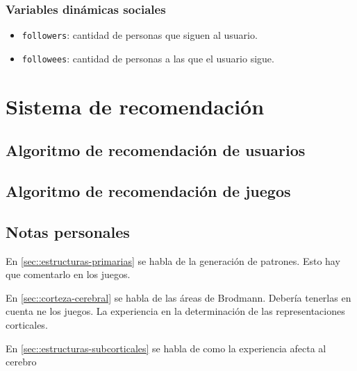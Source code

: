 \subsubsection{Variables dinámicas sociales}

\begin{itemize}
\item {\tt followers}: cantidad de personas que siguen al usuario.
\item {\tt followees}: cantidad de personas a las que el usuario sigue.
\end{itemize}




\section{Sistema de recomendación}


\subsection{Algoritmo de recomendación de usuarios}

\subsection{Algoritmo de recomendación de juegos}

\subsection{Notas personales}

En \ref{sec::estructuras-primarias} se habla de la generación de patrones. Esto hay que comentarlo en los juegos.

En \ref{sec::corteza-cerebral} se habla de las áreas de Brodmann. Debería tenerlas en cuenta ne los juegos. La experiencia en la determinación de las representaciones corticales.

En \ref{sec::estructuras-subcorticales} se habla de como la experiencia afecta al cerebro

